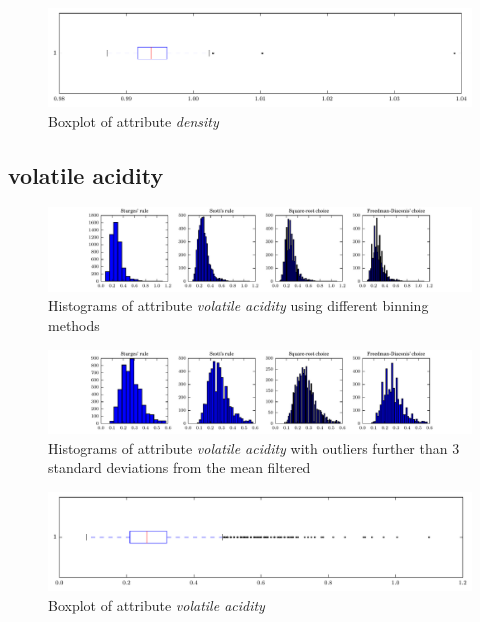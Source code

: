 \documentclass{report}
\begin{document}
\begin{figure}[H]
\includegraphics[width=\textwidth]{boxplots/density.pdf}
\caption{Boxplot of attribute \emph{density}}\end{figure}

\newpage\subsection{volatile acidity}
\begin{figure}[H]
\includegraphics[width=\textwidth]{histograms/volatile_acidity.pdf}
\caption{Histograms of attribute \emph{volatile acidity} using different binning methods}\end{figure}

\begin{figure}[H]
\includegraphics[width=\textwidth]{histograms/volatile_acidity_filtered.pdf}
\caption{Histograms of attribute \emph{volatile acidity} with outliers further than 3 standard deviations from the mean filtered}
\end{figure}

\begin{figure}[H]
\includegraphics[width=\textwidth]{boxplots/volatile_acidity.pdf}
\caption{Boxplot of attribute \emph{volatile acidity}}\end{figure}
\end{document}

